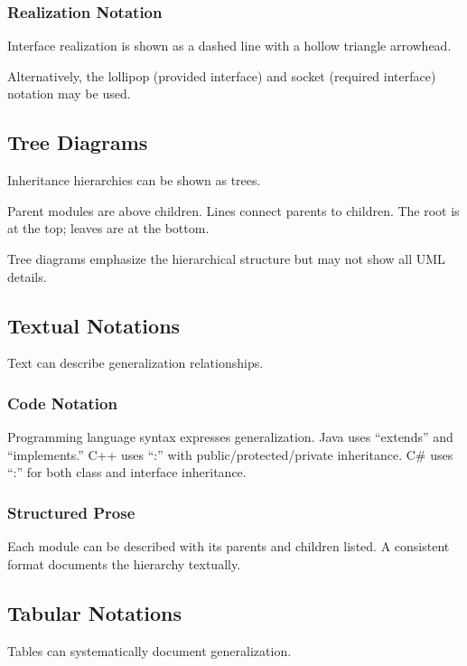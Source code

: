 \documentclass[11pt]{article}
\begin{document}
\subsubsection{Realization Notation}

Interface realization is shown as a dashed line with a hollow triangle arrowhead.

Alternatively, the lollipop (provided interface) and socket (required interface) notation may be used.

\subsection{Tree Diagrams}

Inheritance hierarchies can be shown as trees.

Parent modules are above children. Lines connect parents to children. The root is at the top; leaves are at the bottom.

Tree diagrams emphasize the hierarchical structure but may not show all UML details.

\subsection{Textual Notations}

Text can describe generalization relationships.

\subsubsection{Code Notation}

Programming language syntax expresses generalization. Java uses ``extends'' and ``implements.'' C++ uses ``:'' with public/protected/private inheritance. C\# uses ``:'' for both class and interface inheritance.

\subsubsection{Structured Prose}

Each module can be described with its parents and children listed. A consistent format documents the hierarchy textually.

\subsection{Tabular Notations}

Tables can systematically document generalization.
\end{document}

